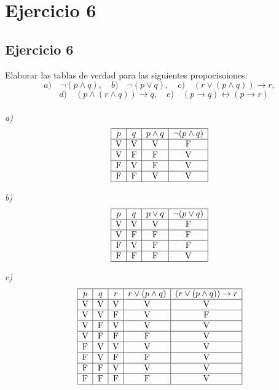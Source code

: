 \chapter*{Ejercicio 6}
\section*{Ejercicio 6}

Elaborar las tablas de verdad para las siguientes propocisoiones:
\[
a) \quad \neg (p \land q), \quad b)\quad \neg (p \lor q),\quad c) \quad (r \lor ( p \land q)) \to r,\] 
\[\quad d) \quad (p \land ( r \land q) ) \to  q, \quad e) \quad (p \to q) \leftrightarrow ( p \to r)
\] \\

\textit{a) }
\[
\begin{array}{|c|c|c|c|c|}
\hline
p & q & p \land q & \neg (p \land q) \\
\hline
\text{V} & \text{V} & \text{V} & \text{F} \\
\hline
\text{V} & \text{F} & \text{F} & \text{V} \\
\hline
\text{F} & \text{V} & \text{F} & \text{V} \\
\hline
\text{F} & \text{F} & \text{V} & \text{V} \\
\hline
\end{array}
\]  


\textit{b) }
\[
\begin{array}{|c|c|c|c|}
\hline
p & q & p \lor q & \neg (p \lor q) \\
\hline
\text{V} & \text{V} & \text{V} & \text{F} \\
\hline
\text{V} & \text{F} & \text{F} & \text{F} \\
\hline
\text{F} & \text{V} & \text{F} & \text{F} \\
\hline
\text{F} & \text{F} & \text{F} & \text{V} \\
\hline
\end{array}
\]

\textit{c) }
\[
\begin{array}{|c|c|c|c|c|}
\hline
p & q & r & r \lor (p \land q) & (r \lor (p \land q)) \rightarrow r \\
\hline
\text{V} & \text{V} & \text{V} & \text{V} & \text{V} \\
\hline
\text{V} & \text{V} & \text{F} & \text{V} & \text{F} \\
\hline
\text{V} & \text{F} & \text{V} & \text{V} & \text{V} \\
\hline
\text{V} & \text{F} & \text{F} & \text{F} & \text{V} \\
\hline
\text{F} & \text{V} & \text{V} & \text{V} & \text{V} \\
\hline
\text{F} & \text{V} & \text{F} & \text{F} & \text{V} \\
\hline
\text{F} & \text{F} & \text{V} & \text{V} & \text{V} \\
\hline
\text{F} & \text{F} & \text{F} & \text{F} & \text{V} \\
\hline
\end{array}
\]

